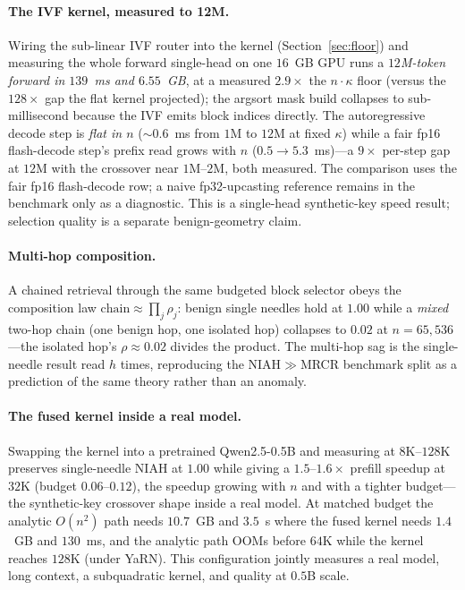 \documentclass[11pt]{article}
\numberwithin{equation}{section}
\begin{document}
\paragraph{The IVF kernel, measured to 12M.} Wiring the sub-linear IVF router into the kernel
(Section~\ref{sec:floor}) and measuring the whole forward single-head on one $16$~GB GPU runs a
\emph{$12$M-token forward in $139$~ms and $6.55$~GB}, at a measured $2.9\times$ the $n\!\cdot\!\kappa$ floor
(versus the $128\times$ gap the flat kernel projected); the argsort mask build collapses to sub-millisecond
because the IVF emits block indices directly. The autoregressive decode step is \emph{flat in $n$}
(${\sim}0.6$~ms from $1$M to $12$M at fixed $\kappa$) while a fair fp16 flash-decode step's prefix read grows
with $n$ ($0.5\to5.3$~ms)---a $9\times$ per-step gap at $12$M with the crossover near $1$M--$2$M, both
measured. The comparison uses the fair fp16 flash-decode row; a naive fp32-upcasting reference remains in the
benchmark only as a diagnostic. This is a single-head synthetic-key speed result; selection quality is a
separate benign-geometry claim.

\paragraph{Multi-hop composition.} A chained retrieval through the same budgeted block selector obeys the
composition law $\text{chain}\approx\prod_j\rho_j$: benign single needles hold at $1.00$ while a \emph{mixed}
two-hop chain (one benign hop, one isolated hop) collapses to $0.02$ at $n=65{,}536$---the isolated hop's
$\rho\!\approx\!0.02$ divides the product. The multi-hop sag is the single-needle result read $h$ times,
reproducing the NIAH${\gg}$MRCR benchmark split as a prediction of the same theory rather than an anomaly.

\paragraph{The fused kernel inside a real model.} Swapping the kernel into a pretrained Qwen2.5-0.5B and
measuring at $8$K--$128$K preserves single-needle NIAH at $1.00$ while giving a $1.5$--$1.6\times$ prefill
speedup at $32$K (budget $0.06$--$0.12$), the speedup growing with $n$ and with a tighter budget---the
synthetic-key crossover shape inside a real model. At matched budget the analytic $O(n^2)$ path needs
$10.7$~GB and $3.5$~s where the fused kernel needs $1.4$~GB and $130$~ms, and the analytic path OOMs before
$64$K while the kernel reaches $128$K (under YaRN). This configuration jointly measures a real model, long
context, a subquadratic kernel, and quality at $0.5$B scale.
\end{document}

